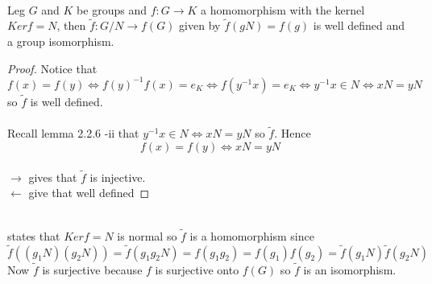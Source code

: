 \documentclass{article}
\begin{document}
\begin{theorem} \leavevmode\\ 
    Leg $G $ and $K$ be groups and $f: G \rightarrow K$ a homomorphism with the kernel $Ker f = N$, then $\tilde{f}: G /N \rightarrow f(G)$  given by $\tilde{f}(gN) = f(g)$ is well defined and a group isomorphism. 
\end{theorem}
\begin{proof}
    Notice that $f(x) = f(y) \iff f(y)^{-1} f(x) = e_K \iff f(y^{-1}x) = e_K \iff y^{-1}x \in N \iff xN = yN$ so $\tilde{f}$ is well defined. \\
   \\ Recall lemma 2.2.6 -ii that $y^{-1}x \in N \iff xN = yN$ so $\tilde{f}$. Hence $$f(x) = f(y) \iff xN = yN$$ \\ 
   $\rightarrow$ gives that $\tilde{f}$ is injective. \\
   $\leftarrow$ give that well defined
   \end{proof}

\begin{proposition}[2.4.9] \leavevmode \\ 
    states that $Ker f = N$ is normal so $\tilde{f}$ is a homomorphism since $\tilde{f}((g_1N)( g_2N)) = \tilde{f}(g_1 g_2 N) = f(g_1 g_2) = f(g_1) f(g_2) = \tilde{f}(g_1 N) \tilde{f}(g_2 N)$ \\ 
    Now $\tilde{f}$ is surjective because $f$ is surjective onto $f(G)$ so $\tilde{f}$ is an isomorphism. 
    
\end{proposition}
 
\end{document}
